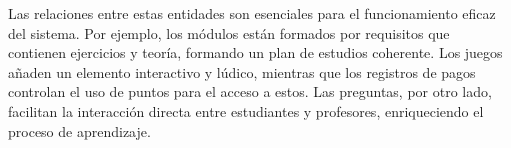 Las relaciones entre estas entidades son esenciales para el funcionamiento eficaz del sistema. Por ejemplo, los módulos están formados por requisitos que contienen ejercicios y teoría, formando un plan de estudios coherente. Los juegos añaden un elemento interactivo y lúdico, mientras que los registros de pagos controlan el uso de puntos para el acceso a estos. Las preguntas, por otro lado, facilitan la interacción directa entre estudiantes y profesores, enriqueciendo el proceso de aprendizaje.
